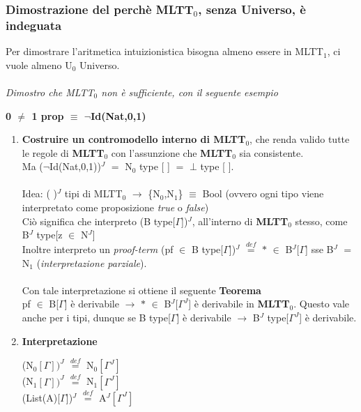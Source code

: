 \subsubsection{Dimostrazione del perch\`e MLTT$_0$, senza Universo, \`e indeguata}
\label{subsec:dimostro-perch\`e-MLTT$_0$-senza-Universo-\`e-indeguata}
Per dimostrare l'aritmetica intuizionistica bisogna almeno essere in MLTT$_1$, ci vuole almeno U$_0$ Universo.\\\\
\textit{Dimostro che MLTT$_0$ non \`e sufficiente, con il seguente esempio}
\begin{center}
\textbf{0 $\neq$ 1 prop $\equiv$ $\neg$Id(Nat,0,1)}
\end{center}
\noindent
\begin{enumerate}
\item \textbf{Costruire un contromodello interno di MLTT$_0$}, che renda valido tutte le regole di \textbf{MLTT$_0$} con l'assunzione che \textbf{MLTT$_0$} sia consistente.\\
Ma ($\neg$Id(Nat,0,1))$^J$ $=$ N$_0$ type [ ] $=$ $\bot$ type [ ].\\\\
\noindent
Idea: ( )$^J$ tipi di MLTT$_0$ $\rightarrow$ \{N$_0$,N$_1$\} $\equiv$ Bool (ovvero ogni tipo viene interpretato come proposizione \textit{true} o \textit{false})\\
Ci\`o significa che interpreto (B type[$\Gamma$])$^J$, all'interno di \textbf{MLTT$_0$} stesso, come B$^J$ type[z $\in$ N$^J$]\\
Inoltre interpreto un \textit{proof-term} (pf $\in$ B type[$\Gamma$])$^J$ ${\overset{\mathit{def}}{=}}$ $\ast$ $\in$ B$^J$[$\Gamma$] sse B$^J$ $=$ N$_1$ (\textit{interpretazione parziale}).\\\\
\noindent
Con tale interpretazione si ottiene il seguente \textbf{Teorema}\\
pf $\in$ B[$\Gamma$] \`e derivabile $\rightarrow$ $\ast$ $\in$ B$^J$[$\Gamma^J$] \`e derivabile in \textbf{MLTT$_0$}. Questo vale anche per i tipi, dunque se B type[$\Gamma$] \`e derivabile $\rightarrow$ B$^J$ type[$\Gamma^J$] \`e derivabile.
\item \textbf{Interpretazione}
\begin{center}
(N$_0[\Gamma])^J$ ${\overset{\mathit{def}}{=}}$ N$_0[\Gamma^J]$\\
(N$_1[\Gamma])^J$ ${\overset{\mathit{def}}{=}}$ N$_1[\Gamma^J]$\\
(List(A)[$\Gamma$])$^J$ ${\overset{\mathit{def}}{=}}$ A$^J[\Gamma^J]$\\

\end{center}
\end{enumerate}
